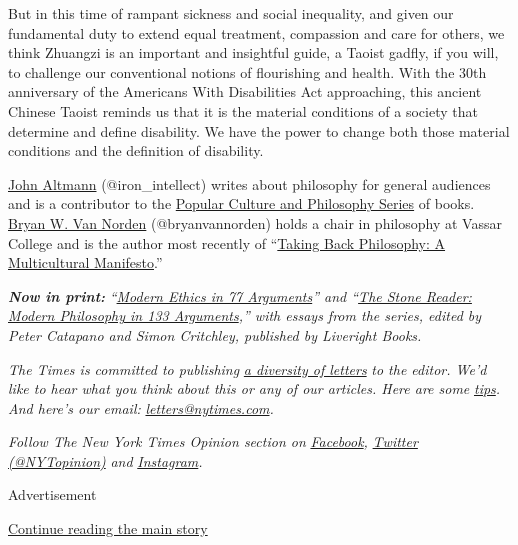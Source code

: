 But in this time of rampant sickness and social inequality, and given
our fundamental duty to extend equal treatment, compassion and care for
others, we think Zhuangzi is an important and insightful guide, a Taoist
gadfly, if you will, to challenge our conventional notions of
flourishing and health. With the 30th anniversary of the Americans With
Disabilities Act approaching, this ancient Chinese Taoist reminds us
that it is the material conditions of a society that determine and
define disability. We have the power to change both those material
conditions and the definition of disability.

\href{https://independent.academia.edu/JohnAltmann}{John Altmann}
(@iron\_intellect) writes about philosophy for general audiences and is
a contributor to the
\href{http://www.opencourtbooks.com/categories/pcp.htm}{Popular Culture
and Philosophy Series} of books.
\href{http://www.bryanvannorden.com/}{Bryan W. Van Norden}
(@bryanvannorden) holds a chair in philosophy at Vassar College and is
the author most recently of
``\href{http://cup.columbia.edu/book/taking-back-philosophy/9780231184373}{Taking
Back Philosophy: A Multicultural Manifesto}.''

\emph{\textbf{Now in print:}}
\emph{``}\href{http://bitly.com/1MW2kN3}{\emph{Modern Ethics in 77
Arguments}}\emph{'' and ``}\href{http://bitly.com/1MW2kN3}{\emph{The
Stone Reader: Modern Philosophy in 133 Arguments}}\emph{,'' with essays
from the series, edited by Peter Catapano and Simon Critchley, published
by Liveright Books.}

\emph{The Times is committed to publishing}
\href{https://www.nytimes.com/2019/01/31/opinion/letters/letters-to-editor-new-york-times-women.html}{\emph{a
diversity of letters}} \emph{to the editor. We'd like to hear what you
think about this or any of our articles. Here are some}
\href{https://help.nytimes.com/hc/en-us/articles/115014925288-How-to-submit-a-letter-to-the-editor}{\emph{tips}}\emph{.
And here's our email:}
\href{mailto:letters@nytimes.com}{\emph{letters@nytimes.com}}\emph{.}

\emph{Follow The New York Times Opinion section on}
\href{https://www.facebook.com/nytopinion}{\emph{Facebook}}\emph{,}
\href{http://twitter.com/NYTOpinion}{\emph{Twitter (@NYTopinion)}}
\emph{and}
\href{https://www.instagram.com/nytopinion/}{\emph{Instagram}}\emph{.}

Advertisement

\protect\hyperlink{after-bottom}{Continue reading the main story}

